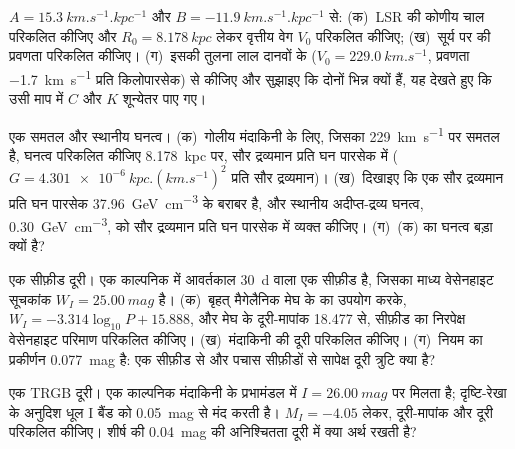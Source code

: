 \begin{exercise}[$\star\star$]\label{exo:b3:milky-way-galaxies:5}
 $A = \qty{15.3}{km.s^{-1}.kpc^{-1}}$ और
$B = \qty{-11.9}{km.s^{-1}.kpc^{-1}}$ से: (क)~LSR की कोणीय चाल परिकलित कीजिए
और $R_0 = \qty{8.178}{kpc}$ लेकर वृत्तीय वेग $V_0$ परिकलित कीजिए;
(ख)~सूर्य पर  की प्रवणता परिकलित कीजिए। (ग)~इसकी तुलना
लाल दानवों के  ($V_0 = \qty{229.0}{km.s^{-1}}$,
प्रवणता \qty{-1.7}{km.s^{-1}} प्रति किलोपारसेक) से कीजिए और सुझाइए कि दोनों
भिन्न क्यों हैं, यह देखते हुए कि उसी माप में $C$ और $K$ शून्येतर पाए गए।
\end{exercise}

\begin{exercise}[$\star\star$]\label{exo:b3:milky-way-galaxies:6}
एक समतल  और स्थानीय घनत्व। (क)~गोलीय मंदाकिनी के लिए, जिसका
 \qty{229}{km.s^{-1}} पर समतल है, घनत्व परिकलित कीजिए
\qty{8.178}{kpc} पर, सौर द्रव्यमान प्रति घन पारसेक में
($G = \qty{4.301e-6}{kpc.(km.s^{-1})^2}$ प्रति सौर द्रव्यमान)। (ख)~दिखाइए
कि एक सौर द्रव्यमान प्रति घन पारसेक \qty{37.96}{GeV.cm^{-3}} के बराबर है, और
स्थानीय अदीप्त-द्रव्य घनत्व, \qty{0.30}{GeV.cm^{-3}}, को सौर द्रव्यमान प्रति घन पारसेक में
व्यक्त कीजिए। (ग)~(क) का घनत्व बड़ा क्यों है?
\end{exercise}

\begin{exercise}[$\star\star$]\label{exo:b3:milky-way-galaxies:7}
एक सीफ़ीड दूरी। एक काल्पनिक  में आवर्तकाल
\qty{30}{d} वाला एक सीफ़ीड है, जिसका माध्य वेसेनहाइट सूचकांक $W_I = \qty{25.00}{mag}$ है।
(क)~बृहत् मैगेलैनिक मेघ के  का उपयोग करके,
$W_I = -3.314\log_{10}P + 15.888$, और मेघ के दूरी-मापांक
18.477 से, सीफ़ीड का निरपेक्ष वेसेनहाइट परिमाण परिकलित कीजिए। (ख)~मंदाकिनी की
दूरी परिकलित कीजिए। (ग)~नियम का प्रकीर्णन \qty{0.077}{mag} है: एक सीफ़ीड से
और पचास सीफ़ीडों से सापेक्ष दूरी त्रुटि क्या है?
\end{exercise}

\begin{exercise}[$\star\star$]\label{exo:b3:milky-way-galaxies:8}
एक TRGB दूरी। एक काल्पनिक मंदाकिनी के प्रभामंडल में  $I = \qty{26.00}{mag}$ पर मिलता है; दृष्टि-रेखा के अनुदिश धूल I बैंड को
\qty{0.05}{mag} से मंद करती है। $M_I = -4.05$ लेकर, दूरी-मापांक और दूरी
परिकलित कीजिए। शीर्ष की \qty{0.04}{mag} की अनिश्चितता
दूरी में क्या अर्थ रखती है?
\end{exercise}

